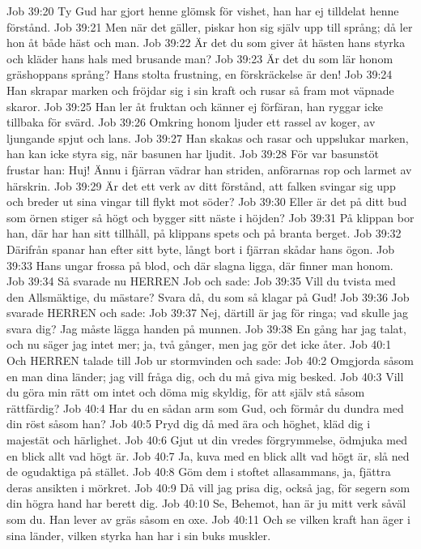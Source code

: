 Job 39:20  Ty Gud har gjort henne glömsk för vishet, han har ej tilldelat henne förstånd.
Job 39:21  Men när det gäller, piskar hon sig själv upp till språng; då ler hon åt både häst och man.
Job 39:22  Är det du som giver åt hästen hans styrka och kläder hans hals med brusande man?
Job 39:23  Är det du som lär honom gräshoppans språng? Hans stolta frustning, en förskräckelse är den!
Job 39:24  Han skrapar marken och fröjdar sig i sin kraft och rusar så fram mot väpnade skaror.
Job 39:25  Han ler åt fruktan och känner ej förfäran, han ryggar icke tillbaka för svärd.
Job 39:26  Omkring honom ljuder ett rassel av koger, av ljungande spjut och lans.
Job 39:27  Han skakas och rasar och uppslukar marken, han kan icke styra sig, när basunen har ljudit.
Job 39:28  För var basunstöt frustar han: Huj! Ännu i fjärran vädrar han striden, anförarnas rop och larmet av härskrin.
Job 39:29  Är det ett verk av ditt förstånd, att falken svingar sig upp och breder ut sina vingar till flykt mot söder?
Job 39:30  Eller är det på ditt bud som örnen stiger så högt och bygger sitt näste i höjden?
Job 39:31  På klippan bor han, där har han sitt tillhåll, på klippans spets och på branta berget.
Job 39:32  Därifrån spanar han efter sitt byte, långt bort i fjärran skådar hans ögon.
Job 39:33  Hans ungar frossa på blod, och där slagna ligga, där finner man honom.
Job 39:34  Så svarade nu HERREN Job och sade:
Job 39:35  Vill du tvista med den Allsmäktige, du mästare? Svara då, du som så klagar på Gud!
Job 39:36  Job svarade HERREN och sade:
Job 39:37  Nej, därtill är jag för ringa; vad skulle jag svara dig? Jag måste lägga handen på munnen.
Job 39:38  En gång har jag talat, och nu säger jag intet mer; ja, två gånger, men jag gör det icke åter.
Job 40:1  Och HERREN talade till Job ur stormvinden och sade:
Job 40:2  Omgjorda såsom en man dina länder; jag vill fråga dig, och du må giva mig besked.
Job 40:3  Vill du göra min rätt om intet och döma mig skyldig, för att själv stå såsom rättfärdig?
Job 40:4  Har du en sådan arm som Gud, och förmår du dundra med din röst såsom han?
Job 40:5  Pryd dig då med ära och höghet, kläd dig i majestät och härlighet.
Job 40:6  Gjut ut din vredes förgrymmelse, ödmjuka med en blick allt vad högt är.
Job 40:7  Ja, kuva med en blick allt vad högt är, slå ned de ogudaktiga på stället.
Job 40:8  Göm dem i stoftet allasammans, ja, fjättra deras ansikten i mörkret.
Job 40:9  Då vill jag prisa dig, också jag, för segern som din högra hand har berett dig.
Job 40:10  Se, Behemot, han är ju mitt verk såväl som du. Han lever av gräs såsom en oxe.
Job 40:11  Och se vilken kraft han äger i sina länder, vilken styrka han har i sin buks muskler.
